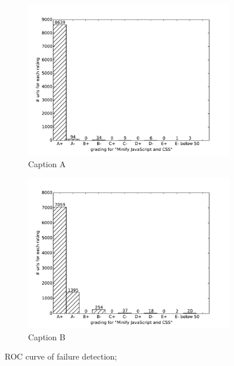 \documentclass[conference]{IEEEtran}
\begin{document}
\begin{figure}
    \centering
    \begin{subfigure}[b]{\columnwidth}        %
        \centering
        \includegraphics[width=\linewidth]{img/virtual-labs/container/Minify JavaScript and CSS.pdf}
        \caption{Caption A}
        \label{fig:A}
    \end{subfigure}
    \hfill
    \begin{subfigure}[b]{\columnwidth}        %
        \centering
        \includegraphics[width=\linewidth]{img/virtual-labs/deploy/Minify JavaScript and CSS.pdf}
        \caption{Caption B}
        \label{fig:B}
    \end{subfigure}
    \caption{ROC curve of failure detection;}
    \label{fig:roc_curve}
\end{figure}
\end{document}
